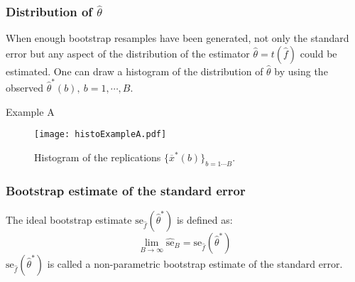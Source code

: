 \frame
{
\frametitle{Distribution of $\hat{\theta}$}

\begin{block}{}
When enough bootstrap resamples have been generated, not only the standard error but any aspect of the distribution  of the estimator $\hat{\theta}=t(\hat{f})$ could be estimated. One can draw a histogram of the distribution of  $\hat{\theta}$ by using the observed $\hat{\theta}^{*}(b),\ b=1,\cdots,B $. 
\end{block}

\begin{exampleblock}{Example A}

\begin{figure}[!h]
\texttt{[image: histoExampleA.pdf]}
\caption{\small Histogram of the replications $\lbrace\overline{x}^{*}(b)\rbrace_{b=1\cdots B}$. }
\end{figure}
\end{exampleblock}

}
\frame
{
\frametitle{Bootstrap estimate of the standard error}

\begin{definition}
The ideal bootstrap estimate $\mathrm{se}_{\hat{f}} (\hat{\theta}^{*})$ is defined as:
$$
\lim_{B\rightarrow \infty} \hat{\mathrm{se}}_{B}=\mathrm{se}_{\hat{f}} (\hat{\theta}^{*})
$$
 $\mathrm{se}_{\hat{f}} (\hat{\theta}^{*})$ is called a \alert{non-parametric bootstrap estimate of the standard error}.
\end{definition}
}




